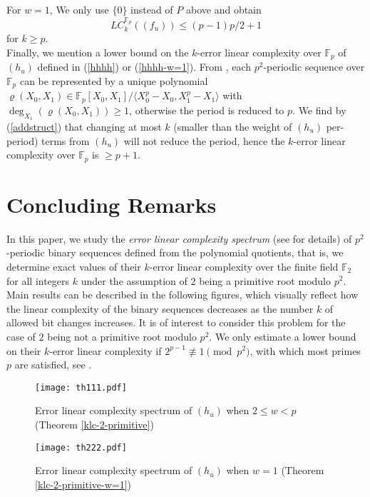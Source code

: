 \documentclass [11pt,a4paper]{article}
\def\F{\mathbb{F}}
\begin{document}
For $w=1$, We only use $\{0\}$ instead of $P$ above and obtain
$$
LC^{\F_p}_k((f_u))\le  (p-1)p/2+1
$$
for $k\ge p$.\\

Finally, we mention a lower bound on the $k$-error linear complexity over $\F_p$ of $(h_u)$
defined in (\ref{hhhh})  or (\ref{hhhh-w=1}). From \cite[Theorem 8]{BEP}, each $p^2$-periodic sequence over $\F_p$ can be represented by a unique polynomial
$\varrho(X_0,X_1) \in \F_p[X_0,X_1]/\langle X^p_0-X_0, X^p_1-X_1\rangle$
with $\deg_{X_1}(\varrho(X_0,X_1))\ge 1$, otherwise the period is reduced to $p$. We find by (\ref{addstruct}) that
changing at most $k$ (smaller than the weight of $(h_u)$ per-period) terms from  $(h_u)$ will not reduce the period, hence
the $k$-error linear complexity over $\F_p$ is $\ge p+1$.




\section{Concluding Remarks}

In this paper, we study the \emph{error linear complexity spectrum} (see \cite{EKKLP} for details) of
$p^2$-periodic
binary sequences defined from the polynomial quotients, that is, we determine exact values of
their $k$-error linear complexity over the finite field $\F_2$
for all integers $k$ under the assumption of $2$ being a primitive root modulo $p^2$. Main results can be described in the following figures, which visually reflect how the linear complexity of the binary sequences decreases as the number $k$ of allowed bit changes increases. It is of interest to consider this problem for the case of $2$ being not a primitive root modulo $p^2$. We only estimate a lower bound on their $k$-error linear complexity if $2^{p-1} \not\equiv 1 \pmod {p^2}$, with which most primes $p$ are satisfied, see \cite{CDP1997}.


\begin{figure}[H]
\centering
\texttt{[image: th111.pdf]}
\caption{Error linear complexity spectrum of $(h_u)$ when $2\le w<p$ (Theorem \ref{klc-2-primitive})}
\end{figure}

\begin{figure}[H]
\centering
\texttt{[image: th222.pdf]}
\caption{Error linear complexity spectrum of $(h_u)$ when $w=1$ (Theorem \ref{klc-2-primitive-w=1})}
\end{figure}
\end{document}
